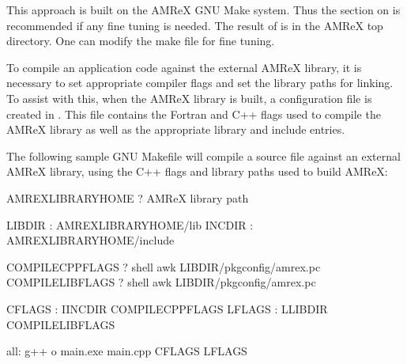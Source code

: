 \documentclass[letterpaper,10pt,english]{sphinxmanual}
\begin{document}
\sphinxAtStartPar
This approach is built on the AMReX GNU Make system. Thus
the section on {\hyperref[\detokenize{BuildingAMReX:sec-build-make}]{}} is recommended if any fine tuning is
needed.  The result of  is  in the AMReX
top directory.  One can modify the make file for fine tuning.

\sphinxAtStartPar
To compile an application code against the external AMReX library, it
is necessary to set appropriate compiler flags and set the library
paths for linking. To assist with this, when the AMReX library is
built, a configuration file is created in .
This file contains the Fortran and
C++ flags used to compile the AMReX library as well as the appropriate
library and include entries.

\sphinxAtStartPar
The following sample GNU Makefile will compile a  source
file against an external AMReX library, using the C++ flags and
library paths used to build AMReX:

\begin{sphinxVerbatim}[commandchars=\\\{\}]
AMREX\PYGZus{}LIBRARY\PYGZus{}HOME ? \PYG{o}{[}AMReX library path\PYG{o}{]}

LIBDIR : AMREX\PYGZus{}LIBRARY\PYGZus{}HOME/lib
INCDIR : AMREX\PYGZus{}LIBRARY\PYGZus{}HOME/include

COMPILE\PYGZus{}CPP\PYGZus{}FLAGS ? shell awk  LIBDIR/pkgconfig/amrex.pc
COMPILE\PYGZus{}LIB\PYGZus{}FLAGS ? shell awk  LIBDIR/pkgconfig/amrex.pc

CFLAGS : \PYGZhy{}IINCDIR COMPILE\PYGZus{}CPP\PYGZus{}FLAGS
LFLAGS : \PYGZhy{}LLIBDIR COMPILE\PYGZus{}LIB\PYGZus{}FLAGS

all:
        g++ \PYGZhy{}o main.exe main.cpp CFLAGS LFLAGS
\end{sphinxVerbatim}
\end{document}
